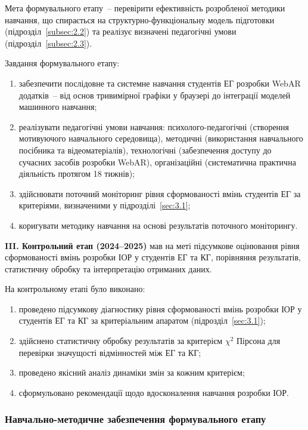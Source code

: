Мета формувального етапу~-- перевірити ефективність розробленої методики навчання, що спирається на структурно-функціональну модель підготовки (підрозділ~\ref{subsec:2.2}) та реалізує визначені педагогічні умови (підрозділ~\ref{subsec:2.3}).

Завдання формувального етапу:
\begin{enumerate}
\item забезпечити послідовне та системне навчання студентів ЕГ розробки WebAR додатків~-- від основ тривимірної графіки у браузері до інтеграції моделей машинного навчання;
\item реалізувати педагогічні умови навчання: психолого-педагогічні (створення мотивуючого навчального середовища), методичні (використання навчального посібника та відеоматеріалів), технологічні (забезпечення доступу до сучасних засобів розробки WebAR), організаційні (систематична практична діяльність протягом 18 тижнів);
\item здійснювати поточний моніторинг рівня сформованості вмінь студентів ЕГ за критеріями, визначеними у підрозділі~\ref{sec:3.1};
\item коригувати методику навчання на основі результатів поточного моніторингу.
\end{enumerate}

\textbf{III. Контрольний етап (2024--2025)} мав на меті підсумкове оцінювання рівня сформованості вмінь розробки ІОР у студентів ЕГ та КГ, порівняння результатів, статистичну обробку та інтерпретацію отриманих даних.

На контрольному етапі було виконано:
\begin{enumerate}
\item проведено підсумкову діагностику рівня сформованості вмінь розробки ІОР у студентів ЕГ та КГ за критеріальним апаратом (підрозділ~\ref{sec:3.1});
\item здійснено статистичну обробку результатів за критерієм $\chi^2$ Пірсона для перевірки значущості відмінностей між ЕГ та КГ;
\item проведено якісний аналіз динаміки змін за кожним критерієм;
\item сформульовано рекомендації щодо вдосконалення навчання розробки ІОР.
\end{enumerate}

\subsubsection{Навчально-методичне забезпечення формувального етапу}

